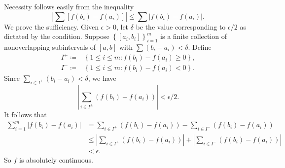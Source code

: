 \begin{exercise}{7.7}
  Necessity follows easily from the inequality
  \[
    \left| \sum \left[ f(b_i) - f(a_i) \right] \right|
    \le \sum \left| f(b_i) - f(a_i) \right|.
  \]
  We prove the sufficiency.
  Given $\epsilon > 0$,
  let $\delta$ be the value corresponding to $\epsilon/2$
  as dictated by the condition.
  Suppose $\left\{ [a_i, b_i] \right\}_{i=1}^m$ is a finite collection of
  nonoverlapping subintervals of $[a, b]$
  with $\sum \left( b_i - a_i \right) < \delta$.
  Define
  \[
    \begin{aligned}
      I^+ \coloneqq &\left\{ 1 \le i \le m : f(b_i) - f(a_i) \ge 0 \right\}, \\
      I^- \coloneqq &\left\{ 1 \le i \le m : f(b_i) - f(a_i) < 0 \right\}.
    \end{aligned}
  \]
  Since $\sum_{i \in I^{\pm}} \left( b_i - a_i \right) < \delta$,
  we have
  \[
    \left| \sum_{i \in I^\pm} \left( f(b_i) - f(a_i) \right) \right|
    < \epsilon/2.
  \]
  It follows that
  \[
    \begin{aligned}
      \sum_{i=1}^m \left| f(b_i) - f(a_i) \right|
      &=\sum_{i \in I^+} \left( f(b_i) - f(a_i) \right)
      - \sum_{i \in I^-} \left( f(b_i) - f(a_i) \right) \\
      &\le \left| \sum_{i \in I^+} \left( f(b_i) - f(a_i) \right) \right|
      + \left| \sum_{i \in I^-} \left( f(b_i) - f(a_i) \right) \right| \\
      &< \epsilon.
    \end{aligned}
  \]
  So $f$ is absolutely continuous.
\end{exercise}
